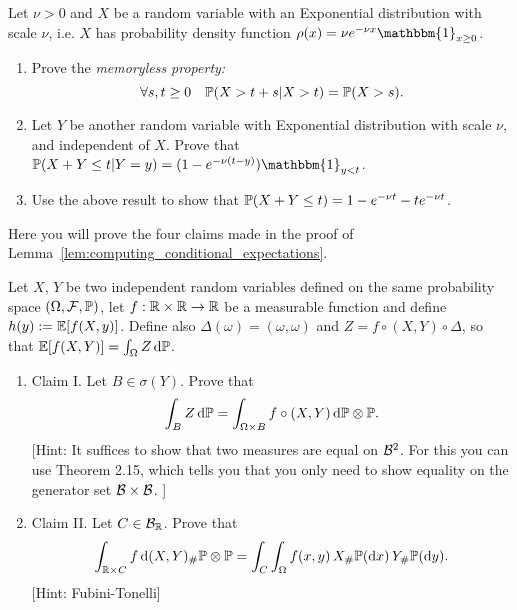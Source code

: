 \begin{problem}
Let $\nu > 0$ and $X$ be a random variable with an Exponential distribution with scale $\nu$, i.e. $X$ has probability density function $\rho(x) = \nu e^{-\nu x} \mathbbm{1}_{x \ge 0}$.
\begin{enumerate}[label={(\alph*)}]
\item Prove the \emph{memoryless property:}
\[
	\forall s,t \ge 0 \quad \mathbb P(X > t+s | X > t) = \mathbb P(X > s).
\]
\item Let $Y$ be another random variable with Exponential distribution with scale $\nu$, and independent of $X$. Prove that $\bbP(X + Y \le t | Y = y) = (1 - e^{-\nu (t - y)}) \mathbbm{1}_{y < t}$.
\item Use the above result to show that $\mathbb P(X + Y \le t) = 1 - e^{-\nu t} - t e^{-\nu t}$. 
\end{enumerate}

\end{problem}

\begin{problem}\label{prb:computing_conditional_expectations}
Here you will prove the four claims made in the proof of Lemma~\ref{lem:computing_conditional_expectations}.

Let $X$, $Y$ be two independent random variables defined on the same probability space $(\Omega, \mathcal F, \mathbb P)$, let $f : \mathbb R \times \mathbb R \to \mathbb R$ be a measurable function and define $h(y) := \mathbb E[f(X,y)]$. Define also $\Delta(\omega) = (\omega, \omega)$ and $Z = f \circ (X, Y) \circ \Delta$, so that $\mathbb E[f(X,Y)] = \int_\Omega Z \, \mathrm{d} \mathbb P$.

\begin{enumerate}[label={(\alph*)}]
\item Claim I. Let $B \in \sigma(Y)$. Prove that
\[
	\int_{B} Z \, \mathrm{d} \mathbb P = \int_{\Omega \times B} f \circ (X,Y) \, \mathrm{d} \mathbb P \otimes \mathbb P.
\]
[Hint: It suffices to show that two measures are equal on $\mathcal B^2$. For this you can use Theorem 2.15, which tells you that you only need to show equality on the generator set $\mathcal B \times \mathcal B$.
]
\item Claim II. Let $C \in \mathcal B_{\mathbb R}$. Prove that
\[
	\int_{\mathbb R \times C} f \, \mathrm{d} (X,Y)_\# \mathbb P \otimes \mathbb P
	= \int_C \int_\Omega f(x,y) \, X_\#\mathbb P(\mathrm{d} x) \, Y_\# \mathbb P (\mathrm{d} y).
\]
[Hint: Fubini-Tonelli]
\end{enumerate}
\end{problem}


